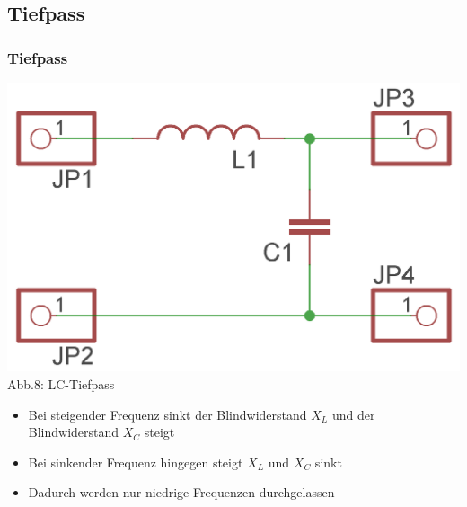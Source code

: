 \subsection*{Tiefpass}
\begin{frame}
  \frametitle{Tiefpass}
  \begin{center}
    \includegraphics[width=\textwidth,height=.5\textheight,keepaspectratio]{e07/LC-Tiefpass.png}\\
    Abb.8: LC-Tiefpass
  \end{center}
  \begin{itemize}
    \item Bei steigender Frequenz sinkt der Blindwiderstand $X_L$ und der Blindwiderstand $X_C$ steigt
    \item Bei sinkender Frequenz hingegen steigt $X_L$ und $X_C$ sinkt
    \item Dadurch werden nur niedrige Frequenzen durchgelassen
  \end{itemize}
\end{frame}

